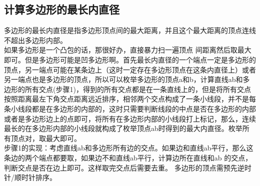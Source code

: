 \subsection{计算多边形的最长内直径}
多边形的最长内直径是指多边形顶点间的最大距离，并且这个最大距离的顶点连线不超出多边形内部。 \\
如果多边形是一个凸包的话，那很好办，直接暴力扫一遍顶点 间距离然后取最大即可。但是多边形可能是凹多边形啊。首先最长内直径的一个端点一定是多边形的顶点，另一端点可能在某条边上（这时一定存在多边形顶点在这条内直径上）或者另一端点也是多边形的顶点，所以可以枚举多边形的顶点a和b，计算直线ab和多边形的所有交点(步骤1)，得到的所有交点都是在一条直线上的，但是将所有交点按照距离最左下角交点距离远近排序，相邻两个交点构成了一条小线段，并不是每条小线段都是在多边形的内部的，这时只需要判断线段的中点是否在多边形的内部或者是多边形边上的点即可，将所有在多边形内部的小线段打上标记，那么，连续最长的在多边形内部的小线段就构成了枚举顶点ab时得到的最大内直径。枚举所有顶点对，取最大即可。 \\
步骤1的实现：考虑直线ab和多边形所有边的交点。如果边和直线ab平行，那么这条边的两个端点都要取，如果边不和直线ab平行，计算边所在直线和ab 的交点，判断交点是否在边上即可。这样取完交点后需要去重。
多边形的顶点需预先逆时针/顺时针排序。
